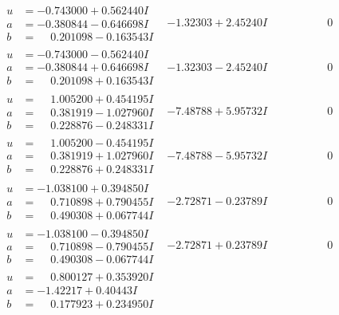 \documentclass[1p]{elsarticle_modified}
\theoremstyle{definition}
\begin{document}
$$\begin{array}{c|c|c}
\begin{aligned}
u &= -0.743000 + 0.562440 I \\
a &= -0.380844 - 0.646698 I \\
b &= \phantom{-}0.201098 - 0.163543 I\end{aligned}
 & -1.32303 + 2.45240 I & \phantom{-0.000000 } 0 \\ \hline\begin{aligned}
u &= -0.743000 - 0.562440 I \\
a &= -0.380844 + 0.646698 I \\
b &= \phantom{-}0.201098 + 0.163543 I\end{aligned}
 & -1.32303 - 2.45240 I & \phantom{-0.000000 } 0 \\ \hline\begin{aligned}
u &= \phantom{-}1.005200 + 0.454195 I \\
a &= \phantom{-}0.381919 - 1.027960 I \\
b &= \phantom{-}0.228876 - 0.248331 I\end{aligned}
 & -7.48788 + 5.95732 I & \phantom{-0.000000 } 0 \\ \hline\begin{aligned}
u &= \phantom{-}1.005200 - 0.454195 I \\
a &= \phantom{-}0.381919 + 1.027960 I \\
b &= \phantom{-}0.228876 + 0.248331 I\end{aligned}
 & -7.48788 - 5.95732 I & \phantom{-0.000000 } 0 \\ \hline\begin{aligned}
u &= -1.038100 + 0.394850 I \\
a &= \phantom{-}0.710898 + 0.790455 I \\
b &= \phantom{-}0.490308 + 0.067744 I\end{aligned}
 & -2.72871 - 0.23789 I & \phantom{-0.000000 } 0 \\ \hline\begin{aligned}
u &= -1.038100 - 0.394850 I \\
a &= \phantom{-}0.710898 - 0.790455 I \\
b &= \phantom{-}0.490308 - 0.067744 I\end{aligned}
 & -2.72871 + 0.23789 I & \phantom{-0.000000 } 0 \\ \hline\begin{aligned}
u &= \phantom{-}0.800127 + 0.353920 I \\
a &= -1.42217 + 0.40443 I \\
b &= \phantom{-}0.177923 + 0.234950 I\end{aligned}

\end{array}$$
\end{document}
